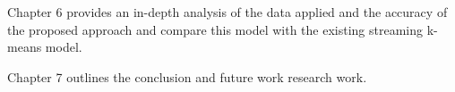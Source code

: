 Chapter 6 provides an in-depth analysis of the data applied and the accuracy of the proposed approach and compare this model with the existing streaming k-means model.

Chapter 7 outlines the conclusion and future work research work.
% 









